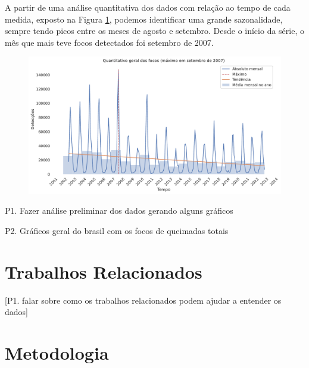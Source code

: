 \documentclass[cic,tc]{iiufrgs}
\begin{document}
A partir de uma análise quantitativa dos dados com relação ao tempo de cada medida,
exposto na Figura \ref{fig:quantitativo_geral}, podemos identificar uma grande 
sazonalidade, sempre tendo picos entre os meses de agosto e setembro. Desde o 
início da série, o mês que mais teve focos detectados foi setembro de 2007. 

\begin{figure}[H]
    \caption{}
    \begin{center}
        \includegraphics[width=35em]{quantitativo_geral}
    \end{center}
    \label{fig:quantitativo_geral}
\end{figure}


P1. Fazer análise preliminar dos dados gerando alguns gráficos \par
P2. Gráficos geral do brasil com os focos de queimadas totais \cite{geographicDataSciencePython} \par



\chapter{Trabalhos Relacionados}

[P1. falar sobre como os trabalhos relacionados podem ajudar a entender 
os dados] \par



\chapter{Metodologia}
\end{document}
